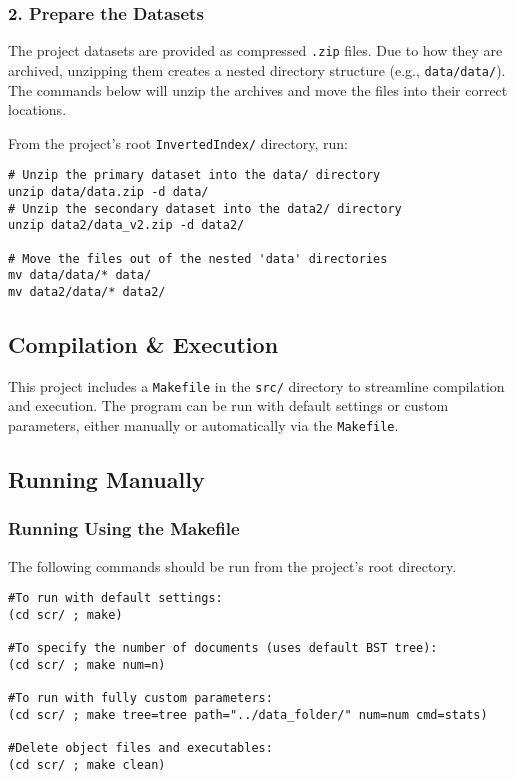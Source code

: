 \subsubsection{2. Prepare the Datasets}

The project datasets are provided as compressed \texttt{.zip} files. Due to how they are archived, unzipping them creates a nested directory structure (e.g., \texttt{data/data/}). The commands below will unzip the archives and move the files into their correct locations.

From the project's root \texttt{InvertedIndex/} directory, run:
\begin{verbatim}
# Unzip the primary dataset into the data/ directory
unzip data/data.zip -d data/
# Unzip the secondary dataset into the data2/ directory
unzip data2/data_v2.zip -d data2/

# Move the files out of the nested 'data' directories
mv data/data/* data/
mv data2/data/* data2/
\end{verbatim}


\subsection{Compilation \& Execution}

This project includes a \texttt{Makefile} in the \texttt{src/} directory to streamline compilation and execution. The program can be run with default settings or custom parameters, either manually or automatically via the \texttt{Makefile}.

\subsection{Running Manually}

\subsubsection{Running Using the Makefile}

The following commands should be run from the project's root directory.
    
    \begin{verbatim}
#To run with default settings:
(cd scr/ ; make)

#To specify the number of documents (uses default BST tree):
(cd scr/ ; make num=n)
    
#To run with fully custom parameters:
(cd scr/ ; make tree=tree path="../data_folder/" num=num cmd=stats)

#Delete object files and executables: 
(cd scr/ ; make clean)
    \end{verbatim}



